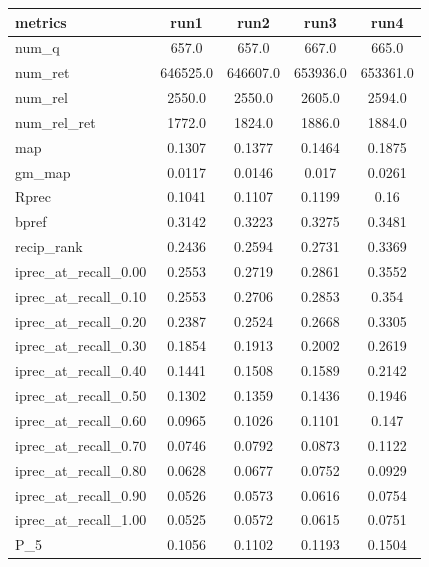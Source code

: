\begin{center}
    \begin{table}[h!]
    \begin{tabular}{ |l|c|c|c|c| } 
        \hline
        metrics & run1 & run2 & run3 & run4 \\ \hline
        num\_q & 657.0 & 657.0 & 667.0 & 665.0 \\ \hline
        num\_ret & 646525.0 & 646607.0 & 653936.0 & 653361.0 \\ \hline
        num\_rel & 2550.0 & 2550.0 & 2605.0 & 2594.0 \\ \hline
        num\_rel\_ret & 1772.0 & 1824.0 & 1886.0 & 1884.0 \\ \hline
        map & 0.1307 & 0.1377 & 0.1464 & 0.1875 \\ \hline
        gm\_map & 0.0117 & 0.0146 & 0.017 & 0.0261 \\ \hline
        Rprec & 0.1041 & 0.1107 & 0.1199 & 0.16 \\ \hline
        bpref & 0.3142 & 0.3223 & 0.3275 & 0.3481 \\ \hline
        recip\_rank & 0.2436 & 0.2594 & 0.2731 & 0.3369 \\ \hline
        iprec\_at\_recall\_0.00 & 0.2553 & 0.2719 & 0.2861 & 0.3552 \\ \hline
        iprec\_at\_recall\_0.10 & 0.2553 & 0.2706 & 0.2853 & 0.354 \\ \hline
        iprec\_at\_recall\_0.20 & 0.2387 & 0.2524 & 0.2668 & 0.3305 \\ \hline
        iprec\_at\_recall\_0.30 & 0.1854 & 0.1913 & 0.2002 & 0.2619 \\ \hline
        iprec\_at\_recall\_0.40 & 0.1441 & 0.1508 & 0.1589 & 0.2142 \\ \hline
        iprec\_at\_recall\_0.50 & 0.1302 & 0.1359 & 0.1436 & 0.1946 \\ \hline
        iprec\_at\_recall\_0.60 & 0.0965 & 0.1026 & 0.1101 & 0.147 \\ \hline
        iprec\_at\_recall\_0.70 & 0.0746 & 0.0792 & 0.0873 & 0.1122 \\ \hline
        iprec\_at\_recall\_0.80 & 0.0628 & 0.0677 & 0.0752 & 0.0929 \\ \hline
        iprec\_at\_recall\_0.90 & 0.0526 & 0.0573 & 0.0616 & 0.0754 \\ \hline
        iprec\_at\_recall\_1.00 & 0.0525 & 0.0572 & 0.0615 & 0.0751 \\ \hline
        P\_5 & 0.1056 & 0.1102 & 0.1193 & 0.1504 \\ \hline

\end{tabular}
\end{table}
\end{center}
